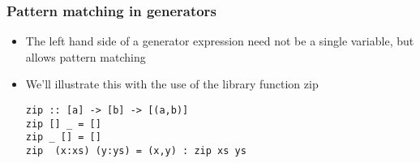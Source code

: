 \documentclass{article}[18pt]
\begin{document}
\subsubsection{Pattern matching in generators}
\begin{itemize}
	\item The left hand side of a generator expression need not be a single variable, but allows pattern matching
	\item We'll illustrate this with the use of the library function zip
\begin{verbatim}
zip :: [a] -> [b] -> [(a,b)]
zip [] _ = []
zip _ [] = []
zip  (x:xs) (y:ys) = (x,y) : zip xs ys
\end{verbatim}
\end{itemize}
\end{document}
